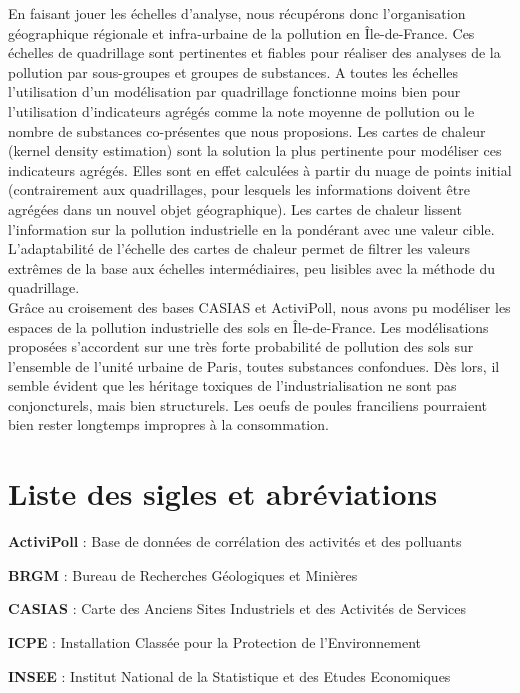 \documentclass[a4paper,twoside,12pt]{book}
\begin{document}
En faisant jouer les échelles d'analyse, nous récupérons donc l'organisation géographique régionale et infra-urbaine de la pollution en Île-de-France. Ces échelles de quadrillage sont pertinentes et fiables pour réaliser des analyses de la pollution par sous-groupes et groupes de substances. A toutes les échelles l'utilisation d'un modélisation par quadrillage fonctionne moins bien pour l'utilisation d'indicateurs agrégés comme la note moyenne de pollution ou le nombre de substances co-présentes que nous proposions. Les cartes de chaleur (kernel density estimation) sont la solution la plus pertinente pour modéliser ces indicateurs agrégés. Elles sont en effet calculées à partir du nuage de points initial (contrairement aux quadrillages, pour lesquels les informations doivent être agrégées dans un nouvel objet géographique). Les cartes de chaleur lissent l'information sur la pollution industrielle en la pondérant avec une valeur cible. L'adaptabilité de l'échelle des cartes de chaleur permet de filtrer les valeurs extrêmes de la base aux échelles intermédiaires, peu lisibles avec la méthode du quadrillage.  \\

Grâce au croisement des bases CASIAS et ActiviPoll, nous avons pu modéliser les espaces de la pollution industrielle des sols en Île-de-France. Les modélisations proposées s'accordent sur une très forte probabilité de pollution des sols sur l'ensemble de l'unité urbaine de Paris, toutes substances confondues. Dès lors, il semble évident que les héritage toxiques de l'industrialisation ne sont pas conjoncturels, mais bien structurels. Les oeufs de poules franciliens pourraient bien rester longtemps impropres à la consommation. 




\chapter*{Liste des sigles et abréviations}

\textbf{ActiviPoll} : Base de données de corrélation des activités et des polluants

\textbf{BRGM} : Bureau de Recherches Géologiques et Minières 

\textbf{CASIAS} : Carte des Anciens Sites Industriels et des Activités de Services

\textbf{ICPE} : Installation Classée pour la Protection de l'Environnement

\textbf{INSEE} : Institut National de la Statistique et des Etudes Economiques 

\printbibliography

\backmatter


\listoffigures
\tableofcontents
\end{document}
